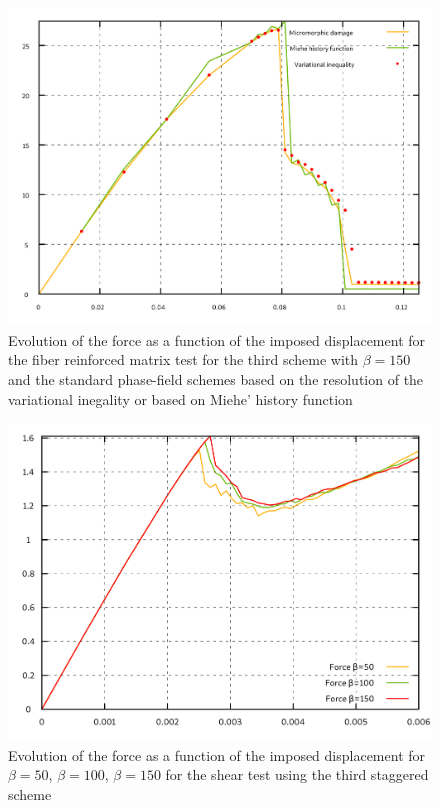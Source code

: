 \begin{figure}[H]
  \centering
  \includegraphics[width=10.cm]{../chapter_003_ef_micromorphic/figures/FiberReinforcedMatrix-force.pdf}
  \caption{Evolution of the force as a function of the imposed displacement for
  the fiber reinforced matrix test for the third scheme with \(\beta=150\)
  and the standard phase-field schemes based on the resolution of the
  variational inegality or based on Miehe' history
  function}
  \label{fig:micromorphic_damage:force}
\end{figure}


\begin{figure}[H]
  \centering
  \includegraphics[width=10.cm]{../chapter_003_ef_micromorphic/figures/shear-force.pdf}
  \caption{Evolution of the force as a function of the imposed displacement for
  \(\beta=50\), \(\beta=100\), \(\beta=150\) for the shear test using the
  third staggered scheme}
  \label{fig:micromorphic_damage:beta}
\end{figure}

